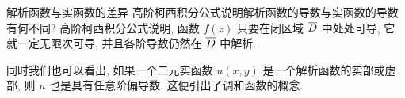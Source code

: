 \begin{frame}{解析函数与实函数的差异}
\onslide<+->
高阶柯西积分公式说明解析函数的导数与实函数的导数有何不同?
\onslide<+->
高阶柯西积分公式说明, 函数 $f(z)$ 只要在闭区域 $\overline D$ 中处处可导, 它就一定无限次可导, 并且各阶导数仍然在 $\overline D$ 中解析.
\onslide<+->

\onslide<+->
同时我们也可以看出, 如果一个二元实函数 $u(x,y)$ 是一个解析函数的实部或虚部, 则 $u$ 也是具有任意阶偏导数.
\onslide<+->
这便引出了调和函数的概念.
\end{frame}


